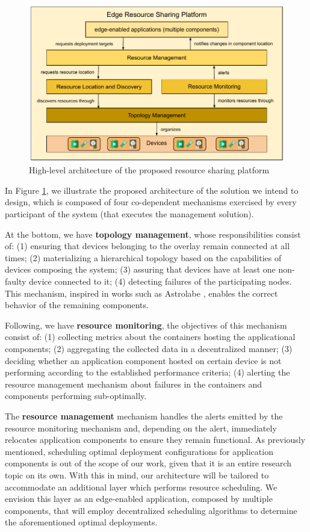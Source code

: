\begin{figure}
    \centering
    \includegraphics[width=0.9\linewidth]{Figures/proposed_architecture_detailed.pdf}
    \caption{High-level architecture of the proposed resource sharing platform}
    \label{fig:proposed_architecture_detailed}
\end{figure}

In Figure \ref{fig:proposed_architecture_detailed}, we illustrate the proposed architecture of the solution we intend to design, which is composed of four co-dependent mechanisms exercised by every participant of the system (that executes the management solution).

At the bottom, we have \textbf{topology management}, whose responsibilities consist of: (1) ensuring that devices belonging to the overlay remain connected at all times; (2) materializing a hierarchical topology based on the capabilities of devices composing the system; (3) assuring that devices have at least one non-faulty device connected to it; (4) detecting failures of the participating nodes. This mechanism, inspired in works such as Astrolabe \cite{Renesse2003}, enables the correct behavior of the remaining components.

Following, we have \textbf{resource monitoring}, the objectives of this mechanism consist of: (1) collecting metrics about the containers hosting the applicational components; (2) aggregating the collected data in a decentralized manner; (3) deciding whether an application component hosted on certain device is not performing according to the established performance criteria; (4) alerting the resource management mechanism about failures in the containers and components performing sub-optimally.

The \textbf{resource management} mechanism handles the alerts emitted by the resource monitoring mechanism and, depending on the alert, immediately relocates application components to ensure they remain functional. As previously mentioned, scheduling optimal deployment configurations for application components is out of the scope of our work, given that it is an entire research topic on its own. With this in mind, our architecture will be tailored to accommodate an additional layer which performs resource scheduling. We envision this layer as an edge-enabled application, composed by multiple components, that will employ decentralized scheduling algorithms to determine the aforementioned optimal deployments.

